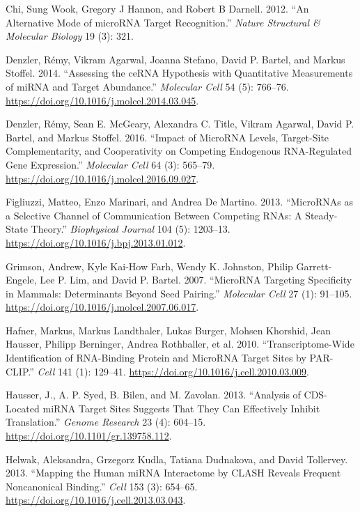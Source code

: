 \documentclass[]{article}
\begin{document}
\leavevmode\hypertarget{ref-chi2012alternative}{}%
Chi, Sung Wook, Gregory J Hannon, and Robert B Darnell. 2012. ``An
Alternative Mode of microRNA Target Recognition.'' \emph{Nature
Structural \& Molecular Biology} 19 (3): 321.

\leavevmode\hypertarget{ref-denzler_assessing_2014}{}%
Denzler, Rémy, Vikram Agarwal, Joanna Stefano, David P. Bartel, and
Markus Stoffel. 2014. ``Assessing the ceRNA Hypothesis with Quantitative
Measurements of miRNA and Target Abundance.'' \emph{Molecular Cell} 54
(5): 766--76. \url{https://doi.org/10.1016/j.molcel.2014.03.045}.

\leavevmode\hypertarget{ref-denzler_impact_2016}{}%
Denzler, Rémy, Sean E. McGeary, Alexandra C. Title, Vikram Agarwal,
David P. Bartel, and Markus Stoffel. 2016. ``Impact of MicroRNA Levels,
Target-Site Complementarity, and Cooperativity on Competing Endogenous
RNA-Regulated Gene Expression.'' \emph{Molecular Cell} 64 (3): 565--79.
\url{https://doi.org/10.1016/j.molcel.2016.09.027}.

\leavevmode\hypertarget{ref-figliuzzi_micrornas_2013}{}%
Figliuzzi, Matteo, Enzo Marinari, and Andrea De Martino. 2013.
``MicroRNAs as a Selective Channel of Communication Between Competing
RNAs: A Steady-State Theory.'' \emph{Biophysical Journal} 104 (5):
1203--13. \url{https://doi.org/10.1016/j.bpj.2013.01.012}.

\leavevmode\hypertarget{ref-grimson_microrna_2007}{}%
Grimson, Andrew, Kyle Kai-How Farh, Wendy K. Johnston, Philip
Garrett-Engele, Lee P. Lim, and David P. Bartel. 2007. ``MicroRNA
Targeting Specificity in Mammals: Determinants Beyond Seed Pairing.''
\emph{Molecular Cell} 27 (1): 91--105.
\url{https://doi.org/10.1016/j.molcel.2007.06.017}.

\leavevmode\hypertarget{ref-hafner_transcriptome-wide_2010}{}%
Hafner, Markus, Markus Landthaler, Lukas Burger, Mohsen Khorshid, Jean
Hausser, Philipp Berninger, Andrea Rothballer, et al. 2010.
``Transcriptome-Wide Identification of RNA-Binding Protein and MicroRNA
Target Sites by PAR-CLIP.'' \emph{Cell} 141 (1): 129--41.
\url{https://doi.org/10.1016/j.cell.2010.03.009}.

\leavevmode\hypertarget{ref-hausser_analysis_2013}{}%
Hausser, J., A. P. Syed, B. Bilen, and M. Zavolan. 2013. ``Analysis of
CDS-Located miRNA Target Sites Suggests That They Can Effectively
Inhibit Translation.'' \emph{Genome Research} 23 (4): 604--15.
\url{https://doi.org/10.1101/gr.139758.112}.

\leavevmode\hypertarget{ref-helwak_mapping_2013}{}%
Helwak, Aleksandra, Grzegorz Kudla, Tatiana Dudnakova, and David
Tollervey. 2013. ``Mapping the Human miRNA Interactome by CLASH Reveals
Frequent Noncanonical Binding.'' \emph{Cell} 153 (3): 654--65.
\url{https://doi.org/10.1016/j.cell.2013.03.043}.
\end{document}
